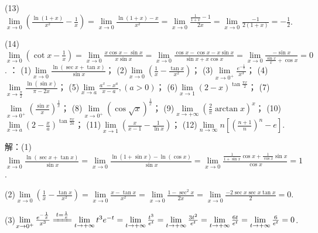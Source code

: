 \documentclass[12pt,UTF8]{ctexart}
\begin{document}
\begin{enumerate}
(13)$\lim\limits_{x\rightarrow0}(\frac{\ln(1+x)}{x^2}-\frac1x)=\lim\limits_{x\rightarrow0}\frac{\ln(1+x)-x}{x^2}=\lim\limits_{x\rightarrow0}\frac{\frac1{1+x}-1}{2x}=\lim\limits_{x\rightarrow0}\frac{-1}{2(1+x)}=-\frac12$.

(14)$\lim\limits_{x\rightarrow0}(\cot x-\frac1x)=\lim\limits_{x\rightarrow0}\frac{x\cos x-\sin x}{x\sin x}=\lim\limits_{x\rightarrow0}\frac{\cos x-\cos x-x\sin x}{\sin x+x\cos x}=\lim\limits_{x\rightarrow0}\frac{-\sin x}{\frac{\sin x}x+\cos x}=0$.
：
\newline
(1)$\lim\limits_{x\rightarrow0}\frac{\ln(\sec x+\tan x)}{\sin x}$；
\newline
(2)$\lim\limits_{x\rightarrow0}(\frac1x-\frac{\tan x}{x^2})$；
\newline
(3)$\lim\limits_{x\rightarrow0^+}\frac{e^{-\frac1x}}{x^3}$；
\newline
(4)$\lim\limits_{x\rightarrow\frac\pi2}\frac{\ln(\sin x)}{\pi-2x}$；
\newline
(5)$\lim\limits_{x\rightarrow a}\frac{a^x-x^a}{x-a},(a>0)$；
\newline
(6)$\lim\limits_{x\rightarrow1}(2-x)^{\tan\frac{\pi x}2}$；
\newline
(7)$\lim\limits_{x\rightarrow0^+}(\frac{\sin x}x)^{\frac1x}$；
\newline
(8)$\lim\limits_{x\rightarrow0^+}(\cos\sqrt x)^{\frac1x}$；
\newline
(9)$\lim\limits_{x\rightarrow+\infty}(\frac2\pi\arctan x)^x$；
\newline
(10)$\lim\limits_{x\rightarrow a}(2-\frac xa)^{\tan\frac{\pi x}{2a}}$；
\newline
(11)$\lim\limits_{x\rightarrow1}(\frac x{x-1}-\frac1{\ln x})$；
\newline
(12)$\lim\limits_{n\rightarrow\infty}n[(\frac{n+1}n)^n-e]$.

解：(1)$\lim\limits_{x\rightarrow0}\frac{\ln(\sec x+\tan x)}{\sin x}=\lim\limits_{x\rightarrow0}\frac{\ln(1+\sin x)-\ln(\cos x)}{\sin x}=\lim\limits_{x\rightarrow0}\frac{\frac1{1+\sin x}\cos x+\frac1{\cos x}\sin x}{\cos x}=1$.

(2)$\lim\limits_{x\rightarrow0}(\frac1x-\frac{\tan x}{x^2})=\lim\limits_{x\rightarrow0}\frac{x-\tan x}{x^2}=\lim\limits_{x\rightarrow0}\frac{1-\sec^2x}{2x}=\lim\limits_{x\rightarrow0}\frac{-2\sec x\sec x\tan x}{2}=0$.

(3)$\lim\limits_{x\rightarrow0^+}\frac{e^{-\frac1x}}{x^3}\xlongequal{t=\frac1x}\lim\limits_{t\rightarrow+\infty}t^3e^{-t}=\lim\limits_{t\rightarrow+\infty}\frac{t^3}{e^t}=\lim\limits_{t\rightarrow+\infty}\frac{3t^2}{e^t}=\lim\limits_{t\rightarrow+\infty}\frac{6t}{e^t}=\lim\limits_{t\rightarrow+\infty}\frac6{e^t}=0$.


\end{enumerate}
\end{document}
